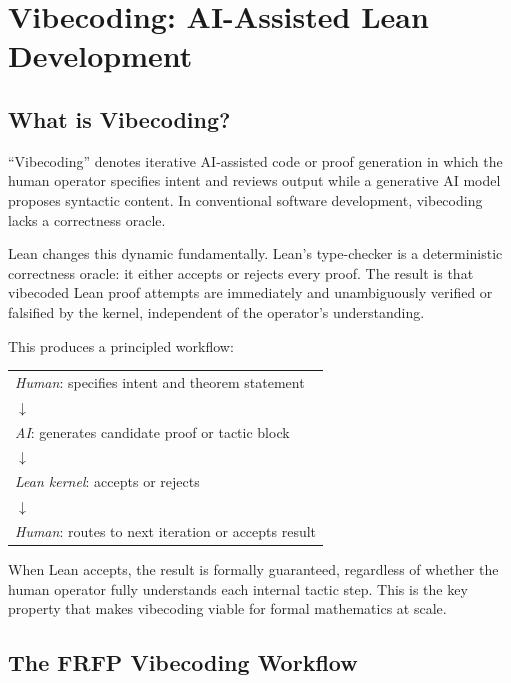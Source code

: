 \section{Vibecoding: AI-Assisted Lean Development}
\label{ch:methodology}

\subsection{What is Vibecoding?}

``Vibecoding'' denotes iterative AI-assisted code or proof generation in which
the human operator specifies intent and reviews output while a generative AI model
proposes syntactic content. In conventional software development, vibecoding lacks
a correctness oracle.

Lean changes this dynamic fundamentally. Lean's type-checker is a deterministic
correctness oracle: it either accepts or rejects every proof. The result is that
vibecoded Lean proof attempts are immediately and unambiguously verified or
falsified by the kernel, independent of the operator's understanding.

This produces a principled workflow:

\begin{center}
\begin{tabular}{l}
\textit{Human}: specifies intent and theorem statement \\
$\downarrow$ \\
\textit{AI}: generates candidate proof or tactic block \\
$\downarrow$ \\
\textit{Lean kernel}: accepts or rejects \\
$\downarrow$ \\
\textit{Human}: routes to next iteration or accepts result
\end{tabular}
\end{center}

When Lean accepts, the result is formally guaranteed, regardless of whether the
human operator fully understands each internal tactic step. This is the key
property that makes vibecoding viable for formal mathematics at scale.

\subsection{The FRFP Vibecoding Workflow}

